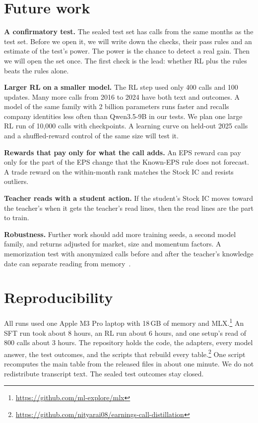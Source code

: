 \documentclass[sigconf,nonacm]{acmart}
\begin{document}
\section{Future work}\label{sec:future}

\textbf{A confirmatory test.}
The sealed test set has calls from the same months as the test set.
Before we open it, we will write down the checks, their pass rules and an estimate of the test's power.
The power is the chance to detect a real gain.
Then we will open the set once.
The first check is the lead: whether RL plus the rules beats the rules alone.

\textbf{Larger RL on a smaller model.}
The RL step used only 400 calls and 100 updates.
Many more calls from 2016 to 2024 have both text and outcomes.
A model of the same family with 2 billion parameters runs faster and recalls company identities less often than Qwen3.5-9B in our tests.
We plan one large RL run of 10{,}000 calls with checkpoints.
A learning curve on held-out 2025 calls and a shuffled-reward control of the same size will test it.

\textbf{Rewards that pay only for what the call adds.}
An EPS reward can pay only for the part of the EPS change that the Known-EPS rule does not forecast.
A trade reward on the within-month rank matches the Stock IC and resists outliers.

\textbf{Teacher reads with a student action.}
If the student's Stock IC moves toward the teacher's when it gets the teacher's read lines, then the read lines are the part to train.

\textbf{Robustness.}
Further work should add more training seeds, a second model family, and returns adjusted for market, size and momentum factors.
A memorization test with anonymized calls before and after the teacher's knowledge date can separate reading from memory~\cite{glassermanlin2023}.

\section{Reproducibility}

All runs used one Apple M3 Pro laptop with 18\,GB of memory and MLX.\footnote{\url{https://github.com/ml-explore/mlx}}
An SFT run took about 8 hours, an RL run about 6 hours, and one setup's read of 800 calls about 3 hours.
The repository holds the code, the adapters, every model answer, the test outcomes, and the scripts that rebuild every table.\footnote{\url{https://github.com/nityarai08/earnings-call-distillation}}
One script recomputes the main table from the released files in about one minute.
We do not redistribute transcript text.
The sealed test outcomes stay closed.



\end{document}
